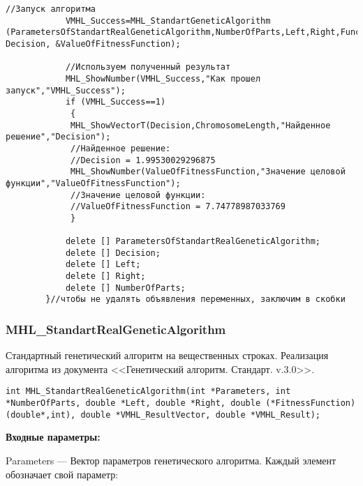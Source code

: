 \documentclass[a4paper,12pt]{article}
\begin{document}
\begin{lstlisting}[label=code_use_MHL_StandartGeneticAlgorithm,caption=Пример использования]
            //Запуск алгоритма
            VMHL_Success=MHL_StandartGeneticAlgorithm (ParametersOfStandartRealGeneticAlgorithm,NumberOfParts,Left,Right,Func2, Decision, &ValueOfFitnessFunction);

            //Используем полученный результат
            MHL_ShowNumber(VMHL_Success,"Как прошел запуск","VMHL_Success");
            if (VMHL_Success==1)
             {
             MHL_ShowVectorT(Decision,ChromosomeLength,"Найденное решение","Decision");
             //Найденное решение:
             //Decision = 1.99530029296875
             MHL_ShowNumber(ValueOfFitnessFunction,"Значение целовой функции","ValueOfFitnessFunction");
             //Значение целовой функции:
             //ValueOfFitnessFunction = 7.74778987033769
             }

            delete [] ParametersOfStandartRealGeneticAlgorithm;
            delete [] Decision;
            delete [] Left;
            delete [] Right;
            delete [] NumberOfParts;
        }//чтобы не удалять объявления переменных, заключим в скобки
\end{lstlisting}

\subsubsection{MHL\_StandartRealGeneticAlgorithm}\label{MHL_StandartRealGeneticAlgorithm}

Стандартный генетический алгоритм на вещественных строках. Реализация алгоритма из документа <<Генетический алгоритм. Стандарт. v.3.0>>.


\begin{lstlisting}[label=code_syntax_MHL_StandartRealGeneticAlgorithm,caption=Синтаксис]
int MHL_StandartRealGeneticAlgorithm(int *Parameters, int *NumberOfParts, double *Left, double *Right, double (*FitnessFunction)(double*,int), double *VMHL_ResultVector, double *VMHL_Result);
\end{lstlisting}

\textbf{Входные параметры:}
 
Parameters --- Вектор параметров генетического алгоритма. Каждый элемент обозначает свой параметр:
 
\end{document}
